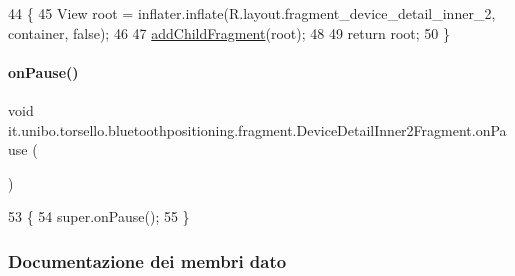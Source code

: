 \begin{DoxyCode}
44                                                                                                       \{
45         View root = inflater.inflate(R.layout.fragment\_device\_detail\_inner\_2, container, \textcolor{keyword}{false});
46 
47         \hyperlink{classit_1_1unibo_1_1torsello_1_1bluetoothpositioning_1_1fragment_1_1DeviceDetailInner2Fragment_af61900b6821dff2086e86d646c990870_af61900b6821dff2086e86d646c990870}{addChildFragment}(root);
48 
49         \textcolor{keywordflow}{return} root;
50     \}
\end{DoxyCode}
\hypertarget{classit_1_1unibo_1_1torsello_1_1bluetoothpositioning_1_1fragment_1_1DeviceDetailInner2Fragment_ab201a51f09d4ccd17f91d5952b9ed788_ab201a51f09d4ccd17f91d5952b9ed788}{}\label{classit_1_1unibo_1_1torsello_1_1bluetoothpositioning_1_1fragment_1_1DeviceDetailInner2Fragment_ab201a51f09d4ccd17f91d5952b9ed788_ab201a51f09d4ccd17f91d5952b9ed788} 
\paragraph{\texorpdfstring{on\+Pause()}{onPause()}}
{\footnotesize\ttfamily void it.\+unibo.\+torsello.\+bluetoothpositioning.\+fragment.\+Device\+Detail\+Inner2\+Fragment.\+on\+Pause (\begin{DoxyParamCaption}{ }\end{DoxyParamCaption})}


\begin{DoxyCode}
53                           \{
54         super.onPause();
55     \}
\end{DoxyCode}


\subsubsection{Documentazione dei membri dato}
\hypertarget{classit_1_1unibo_1_1torsello_1_1bluetoothpositioning_1_1fragment_1_1DeviceDetailInner2Fragment_aa28d537983d4cf578120a9c51eb2b0bb_aa28d537983d4cf578120a9c51eb2b0bb}{}\label{classit_1_1unibo_1_1torsello_1_1bluetoothpositioning_1_1fragment_1_1DeviceDetailInner2Fragment_aa28d537983d4cf578120a9c51eb2b0bb_aa28d537983d4cf578120a9c51eb2b0bb} 
